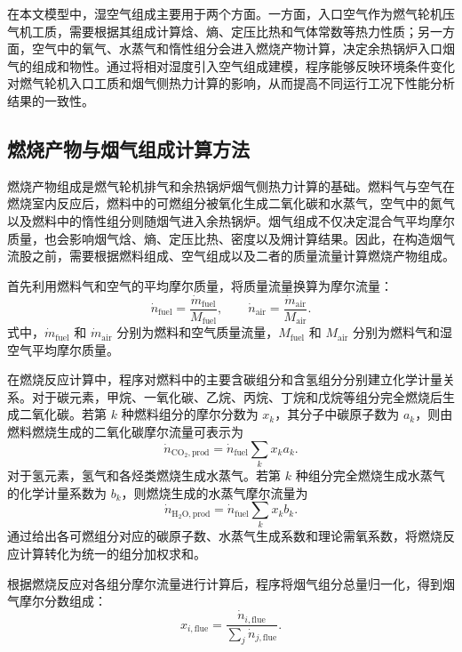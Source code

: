 在本文模型中，湿空气组成主要用于两个方面。一方面，入口空气作为燃气轮机压气机工质，需要根据其组成计算焓、熵、定压比热和气体常数等热力性质；另一方面，空气中的氧气、水蒸气和惰性组分会进入燃烧产物计算，决定余热锅炉入口烟气的组成和物性。通过将相对湿度引入空气组成建模，程序能够反映环境条件变化对燃气轮机入口工质和烟气侧热力计算的影响，从而提高不同运行工况下性能分析结果的一致性。

\subsection{燃烧产物与烟气组成计算方法}

燃烧产物组成是燃气轮机排气和余热锅炉烟气侧热力计算的基础。燃料气与空气在燃烧室内反应后，燃料中的可燃组分被氧化生成二氧化碳和水蒸气，空气中的氮气以及燃料中的惰性组分则随烟气进入余热锅炉。烟气组成不仅决定混合气平均摩尔质量，也会影响烟气焓、熵、定压比热、密度以及㶲计算结果。因此，在构造烟气流股之前，需要根据燃料组成、空气组成以及二者的质量流量计算燃烧产物组成。

首先利用燃料气和空气的平均摩尔质量，将质量流量换算为摩尔流量：
\begin{equation}\label{eq:molar-flow-rate}
\dot{n}_{\mathrm{fuel}}
=
\frac{\dot{m}_{\mathrm{fuel}}}{M_{\mathrm{fuel}}},
\qquad
\dot{n}_{\mathrm{air}}
=
\frac{\dot{m}_{\mathrm{air}}}{M_{\mathrm{air}}}.
\end{equation}
式中，\(\dot{m}_{\mathrm{fuel}}\) 和 \(\dot{m}_{\mathrm{air}}\) 分别为燃料和空气质量流量，\(M_{\mathrm{fuel}}\) 和 \(M_{\mathrm{air}}\) 分别为燃料气和湿空气平均摩尔质量。

在燃烧反应计算中，程序对燃料中的主要含碳组分和含氢组分分别建立化学计量关系。对于碳元素，甲烷、一氧化碳、乙烷、丙烷、丁烷和戊烷等组分完全燃烧后生成二氧化碳。若第 \(k\) 种燃料组分的摩尔分数为 \(x_k\)，其分子中碳原子数为 \(a_k\)，则由燃料燃烧生成的二氧化碳摩尔流量可表示为
\begin{equation}\label{eq:co2-production}
\dot{n}_{\mathrm{CO_2,prod}}
=
\dot{n}_{\mathrm{fuel}}
\sum_k x_k a_k .
\end{equation}
对于氢元素，氢气和各烃类燃烧生成水蒸气。若第 \(k\) 种组分完全燃烧生成水蒸气的化学计量系数为 \(b_k\)，则燃烧生成的水蒸气摩尔流量为
\begin{equation}\label{eq:h2o-production}
\dot{n}_{\mathrm{H_2O,prod}}
=
\dot{n}_{\mathrm{fuel}}
\sum_k x_k b_k .
\end{equation}
通过给出各可燃组分对应的碳原子数、水蒸气生成系数和理论需氧系数，将燃烧反应计算转化为统一的组分加权求和。

根据燃烧反应对各组分摩尔流量进行计算后，程序将烟气组分总量归一化，得到烟气摩尔分数组成：
\begin{equation}\label{eq:flue-gas-composition}
x_{i,\mathrm{flue}}
=
\frac{\dot{n}_{i,\mathrm{flue}}}
{\sum_j \dot{n}_{j,\mathrm{flue}}}.
\end{equation}

